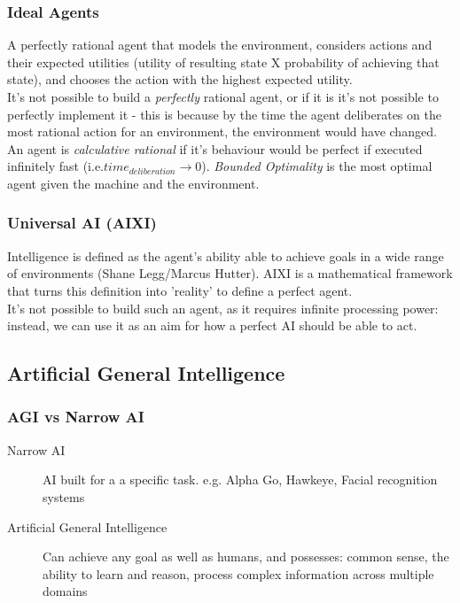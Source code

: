 \subsubsection{Ideal Agents}
A perfectly rational agent that models the environment, considers actions and their expected utilities (utility of resulting state X probability of achieving that state), and chooses the action with the highest expected utility. \\

It's not possible to build a \emph{perfectly} rational agent, or if it is it's not possible to perfectly implement it - this is because by the time the agent deliberates on the most rational action for an environment, the environment would have changed.\\

An agent is \emph{calculative rational} if it's behaviour would be perfect if executed infinitely fast (i.e.$time_{deliberation} \rightarrow 0$). \emph{Bounded Optimality} is the most optimal agent given the machine and the environment.

\subsubsection{Universal AI (AIXI)}Intelligence is defined as the agent's ability able to achieve goals in a wide range of environments (Shane Legg/Marcus Hutter). AIXI is a mathematical framework that turns this definition into 'reality' to define a perfect agent. \\
It's not possible to build such an agent, as it requires infinite processing power: instead, we can use it as an aim for how a perfect AI should be able to act.

\subsection{Artificial General Intelligence}

\subsubsection{AGI vs Narrow AI}
\begin{description}
\item[Narrow AI] AI built for a a specific task. e.g. Alpha Go, Hawkeye, Facial recognition systems
\item[Artificial General Intelligence] Can achieve any goal as well as humans, and possesses: common sense, the ability to learn and reason, process complex information across multiple domains
\end{description}



